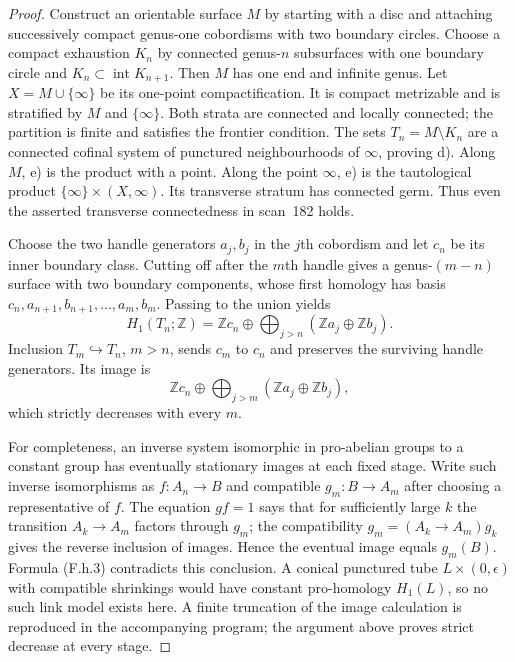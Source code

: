 \begin{proof}
Construct an orientable surface $M$ by starting with a disc and attaching
successively compact genus-one cobordisms with two boundary circles.
Choose a compact exhaustion $K_n$ by connected genus-$n$ subsurfaces
with one boundary circle and $K_n\subset\operatorname{int}K_{n+1}$.
Then $M$ has one end and infinite genus. Let
$X=M\cup\{\infty\}$ be its one-point compactification. It is compact
metrizable and is stratified by $M$ and $\{\infty\}$. Both strata are
connected and locally connected; the partition is finite and satisfies
the frontier condition. The sets
$T_n=M\setminus K_n$ are a connected cofinal system of punctured
neighbourhoods of $\infty$, proving d). Along $M$, e) is the product
with a point. Along the point $\infty$, e) is the tautological product
$\{\infty\}\times(X,\infty)$. Its transverse stratum has connected
germ. Thus even the asserted transverse connectedness in scan~182 holds.

Choose the two handle generators $a_j,b_j$ in the $j$th cobordism and
let $c_n$ be its inner boundary class. Cutting off after the $m$th
handle gives a genus-$(m-n)$ surface with two boundary components,
whose first homology has basis
$c_n,a_{n+1},b_{n+1},\ldots,a_m,b_m$. Passing to the union yields
\[
 H_1(T_n;\mathbb Z)
  =\mathbb Z c_n\oplus\bigoplus_{j>n}
       (\mathbb Z a_j\oplus\mathbb Z b_j).
\]
Inclusion $T_m\hookrightarrow T_n$, $m>n$, sends $c_m$ to $c_n$
and preserves the surviving handle generators. Its image is
\[
 \mathbb Z c_n\oplus\bigoplus_{j>m}
       (\mathbb Z a_j\oplus\mathbb Z b_j),
 \tag{F.h.3}
\]
which strictly decreases with every $m$.

For completeness, an inverse system isomorphic in pro-abelian groups
to a constant group has eventually stationary images at each fixed
stage. Write such inverse isomorphisms as
$f:A_n\to B$ and compatible $g_m:B\to A_m$ after choosing a
representative of $f$. The equation $gf=1$ says that for sufficiently
large $k$ the transition $A_k\to A_m$ factors through $g_m$; the
compatibility $g_m=(A_k\to A_m)g_k$ gives the reverse inclusion of
images. Hence the eventual image equals $g_m(B)$. Formula (F.h.3)
contradicts this conclusion. A conical punctured tube
$L\times(0,\epsilon)$ with compatible shrinkings would have constant
pro-homology $H_1(L)$, so no such link model exists here. A finite
truncation of the image calculation is reproduced in the accompanying
program; the argument above proves strict decrease at every stage.
\end{proof}

